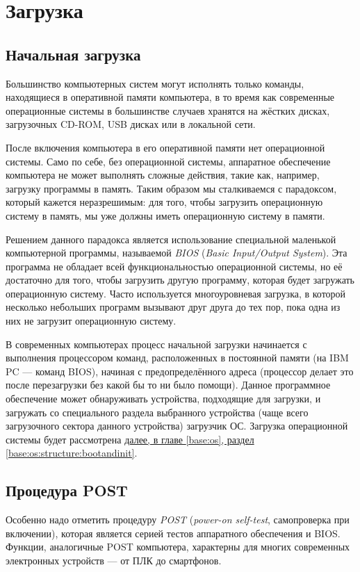 \section{Загрузка}\label{base:introduction:bootup}
\subsection{Начальная загрузка}\label{base:introduction:bootup:BIOS}
Большинство компьютерных систем могут исполнять только команды, находящиеся в оперативной памяти компьютера, в то время как современные операционные системы в большинстве случаев хранятся на жёстких дисках, загрузочных CD-ROM, USB дисках или в локальной сети.

После включения компьютера в его оперативной памяти нет операционной системы. Само по себе, без операционной системы, аппаратное обеспечение компьютера не может выполнять сложные действия, такие как, например, загрузку программы в память.
Таким образом мы сталкиваемся с парадоксом, который кажется неразрешимым: для того, чтобы загрузить операционную систему в память, мы уже должны иметь операционную систему в памяти.

Решением данного парадокса является использование специальной маленькой компьютерной программы, называемой \emph{BIOS} (\emph{Basic Input/Output System}). Эта программа не обладает всей функциональностью операционной системы, но её достаточно для того, чтобы загрузить другую программу, которая будет загружать операционную систему.
Часто используется многоуровневая загрузка, в которой несколько небольших программ вызывают друг друга до тех пор, пока одна из них не загрузит операционную систему.

В современных компьютерах процесс начальной загрузки начинается с выполнения процессором команд, расположенных в постоянной памяти (на IBM PC --- команд BIOS), начиная с предопределённого адреса (процессор делает это после перезагрузки без какой бы то ни было помощи).
Данное программное обеспечение может обнаруживать устройства, подходящие для загрузки, и загружать со специального раздела выбранного устройства (чаще всего загрузочного сектора данного устройства) загрузчик ОС. Загрузка операционной системы будет рассмотрена \hyperref[base:os:structure:bootandinit]{далее, в главе \ref*{base:os}, раздел \ref*{base:os:structure:bootandinit}}.

\subsection{Процедура POST}\label{base:introduction:bootup:post}
Особенно надо отметить процедуру \emph{POST} (\emph{power-on self-test}, самопроверка при включении), которая является серией тестов аппаратного обеспечения и BIOS. Функции, аналогичные POST компьютера, характерны для многих современных электронных устройств --- от ПЛК до смартфонов.

